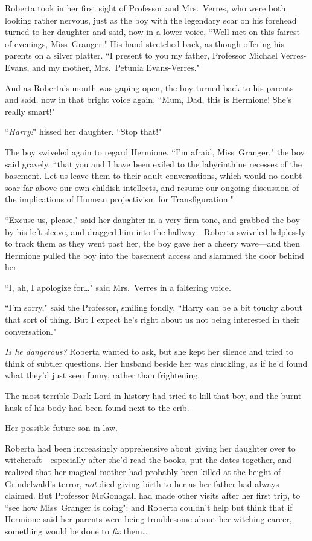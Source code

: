 Roberta took in her first sight of Professor and Mrs.~Verres, who were both looking rather nervous, just as the boy with the legendary scar on his forehead turned to her daughter and said, now in a lower voice, ``Well met on this fairest of evenings, Miss~Granger." His hand stretched back, as though offering his parents on a silver platter. ``I present to you my father, Professor Michael Verres-Evans, and my mother, Mrs.~Petunia Evans-Verres."

And as Roberta's mouth was gaping open, the boy turned back to his parents and said, now in that bright voice again, ``Mum, Dad, this is Hermione! She's really smart!"

``\emph{Harry!}" hissed her daughter. ``Stop that!"

The boy swiveled again to regard Hermione. ``I'm afraid, Miss~Granger," the boy said gravely, ``that you and I have been exiled to the labyrinthine recesses of the basement. Let us leave them to their adult conversations, which would no doubt soar far above our own childish intellects, and resume our ongoing discussion of the implications of Humean projectivism for Transfiguration."

``Excuse us, please," said her daughter in a very firm tone, and grabbed the boy by his left sleeve, and dragged him into the hallway—Roberta swiveled helplessly to track them as they went past her, the boy gave her a cheery wave—and then Hermione pulled the boy into the basement access and slammed the door behind her.

``I, ah, I apologize for{\ldots}" said Mrs.~Verres in a faltering voice.

``I'm sorry," said the Professor, smiling fondly, ``Harry can be a bit touchy about that sort of thing. But I expect he's right about us not being interested in their conversation."

\emph{Is he dangerous?} Roberta wanted to ask, but she kept her silence and tried to think of subtler questions. Her husband beside her was chuckling, as if he'd found what they'd just seen funny, rather than frightening.

The most terrible Dark Lord in history had tried to kill that boy, and the burnt husk of his body had been found next to the crib.

Her possible future son-in-law.

Roberta had been increasingly apprehensive about giving her daughter over to witchcraft—especially after she'd read the books, put the dates together, and realized that her magical mother had probably been killed at the height of Grindelwald's terror, \emph{not} died giving birth to her as her father had always claimed. But Professor McGonagall had made other visits after her first trip, to ``see how Miss~Granger is doing"; and Roberta couldn't help but think that if Hermione said her parents were being troublesome about her witching career, something would be done to \emph{fix} them{\ldots}


